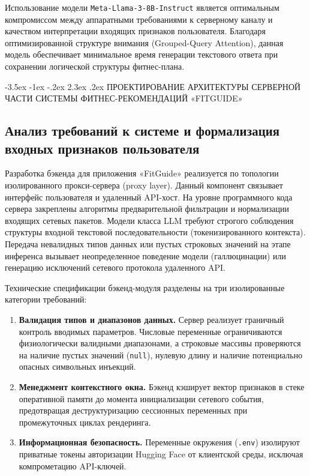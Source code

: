\documentclass[14pt, a4paper]{extarticle}
\makeatletter
\renewcommand\section{\@startsection {section}{1}{\z@}%
                                   {-3.5ex \@plus -1ex \@minus -.2ex}%
                                   {2.3ex \@plus.2ex}%
                                   {\centering\normalfont\Large\bfseries}}
\makeatother
\begin{document}
Использование модели \texttt{Meta-Llama-3-8B-Instruct} является оптимальным компромиссом между аппаратными требованиями к серверному каналу и качеством интерпретации входящих признаков пользователя. Благодаря оптимизированной структуре внимания (Grouped-Query Attention), данная модель обеспечивает минимальное время генерации текстового ответа при сохранении логической структуры фитнес-плана\cite{llama3}.




\newpage
\section{ПРОЕКТИРОВАНИЕ АРХИТЕКТУРЫ СЕРВЕРНОЙ ЧАСТИ СИСТЕМЫ ФИТНЕС-РЕКОМЕНДАЦИЙ «FITGUIDE»}

\subsection{Анализ требований к системе и формализация входных признаков пользователя}

Разработка бэкенда для приложения «FitGuide» реализуется по топологии изолированного прокси-сервера (proxy layer). Данный компонент связывает интерфейс пользователя и удаленный API-хост. На уровне программного кода сервера закреплены алгоритмы предварительной фильтрации и нормализации входящих сетевых пакетов. Модели класса LLM требуют строгого соблюдения структуры входной текстовой последовательности (токенизированного контекста). Передача невалидных типов данных или пустых строковых значений на этапе инференса вызывает неопределенное поведение модели (галлюцинации) или генерацию исключений сетевого протокола удаленного API\cite{software_eng,rest_api}.

Технические спецификации бэкенд-модуля разделены на три изолированные категории требований:
\begin{enumerate}
    \item \textbf{Валидация типов и диапазонов данных.} Сервер реализует граничный контроль вводимых параметров. Числовые переменные ограничиваются физиологически валидными диапазонами, а строковые массивы проверяются на наличие пустых значений (\texttt{null}), нулевую длину и наличие потенциально опасных символьных инъекций.
    \item \textbf{Менеджмент контекстного окна.} Бэкенд кэширует вектор признаков в стеке оперативной памяти до момента инициализации сетевого события, предотвращая деструктуризацию сессионных переменных при промежуточных циклах рендеринга.
\item \textbf{Информационная безопасность.} Переменные окружения (\texttt{.env}) изолируют приватные токены авторизации Hugging Face от клиентской среды, исключая компрометацию API-ключей\cite{dotenv,twelve_factor,security_owasp}.
\end{enumerate}
\end{document}
